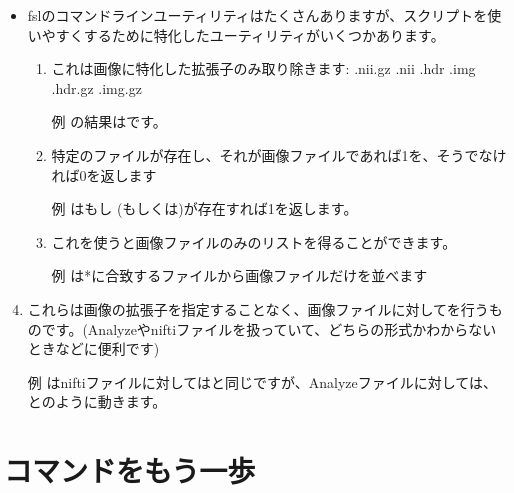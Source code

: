 \documentclass{jsarticle}
\begin{document}
\begin{itemize}

\item fslのコマンドラインユーティリティはたくさんありますが、スクリプトを使いやすくするために特化したユーティリティがいくつかあります。

\begin{enumerate}
\item {\color{red}}

これは画像に特化した拡張子のみ取り除きます:  .nii.gz .nii .hdr .img .hdr.gz .img.gz

例 {\color{red}}の結果は{\color{red}}です。

\item {\color{red}}

特定のファイルが存在し、それが画像ファイルであれば1を、そうでなければ0を返します

例 {\color{red}}はもし{\color{red}} (もしくは{\color{red}})が存在すれば1を返します。

\item {\color{red}}
これを使うと画像ファイルのみのリストを得ることができます。

例 {\color{red}}は*に合致するファイルから画像ファイルだけを並べます

\end{enumerate}
\end{itemize}




\begin{enumerate}
\setcounter{enumi}{3}

\item {\color{red}}

これらは画像の拡張子を指定することなく、画像ファイルに対して{\color{red}}を行うものです。(Analyzeやniftiファイルを扱っていて、どちらの形式かわからないときなどに便利です)

例 {\color{red}}はniftiファイルに対しては{\color{red}}と同じですが、Analyzeファイルに対しては、{\color{red}}と{\color{red}}のように動きます。

\end{enumerate}


\section{コマンドをもう一歩}
\end{document}
